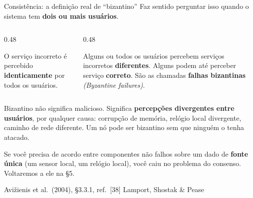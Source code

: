 \documentclass{beamer}
\newcommand{\en}[1]{{\color{depCinza}\textit{#1}}}
\newcommand{\sect}[1]{\par\smallskip\hfill{\tiny\color{black!55}Avi\v{z}ienis et al.\ (2004), #1}}
\begin{document}
\begin{frame}{Consist\^encia: a defini\c{c}\~ao real de ``bizantino''}
    \footnotesize
    Faz sentido perguntar isso quando o sistema tem \textbf{dois ou mais usu\'arios}.
    \medskip
    \begin{columns}[T]
        \begin{column}{0.48\textwidth}
            \begin{tcolorbox}[colback=depVerde!6,colframe=depVerde!60,boxrule=0.6pt,title={\scriptsize\bfseries Falha consistente}]
                \scriptsize
                O servi\c{c}o incorreto \'e percebido \textbf{identicamente} por todos os usu\'arios.
            \end{tcolorbox}
        \end{column}
        \begin{column}{0.48\textwidth}
            \begin{tcolorbox}[colback=depVermelho!6,colframe=depVermelho!65,boxrule=0.6pt,title={\scriptsize\bfseries Falha inconsistente}]
                \scriptsize
                Alguns ou todos os usu\'arios percebem servi\c{c}os incorretos \textbf{diferentes}. Alguns podem at\'e perceber servi\c{c}o \textbf{correto}. S\~ao as chamadas \textbf{falhas bizantinas} \en{(Byzantine failures)}.
            \end{tcolorbox}
        \end{column}
    \end{columns}
    \medskip
    \begin{armadilha}
        \scriptsize
        Bizantino n\~ao significa malicioso. Significa \textbf{percep\c{c}\~oes divergentes entre usu\'arios}, por qualquer causa: corrup\c{c}\~ao de mem\'oria, rel\'ogio local divergente, caminho de rede diferente. Um n\'o pode ser bizantino sem que ningu\'em o tenha atacado.
    \end{armadilha}
    \medskip
    \begin{ancora}
        \footnotesize
        Se voc\^e precisa de acordo entre componentes n\~ao falhos sobre um dado de \textbf{fonte \'unica} (um sensor local, um rel\'ogio local), voc\^e caiu no problema do consenso. Voltaremos a ele na \S5.
    \end{ancora}
    \sect{\S3.3.1, ref.\ [38] Lamport, Shostak \& Pease}
\end{frame}
\end{document}
